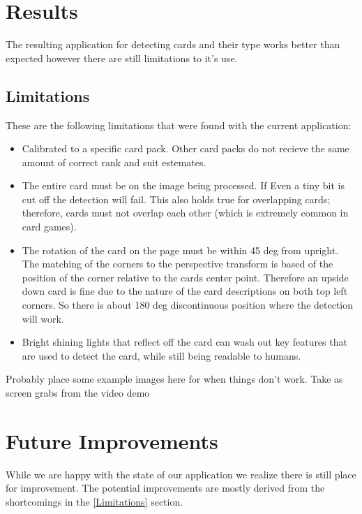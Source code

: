 \documentclass[conference]{IEEEtran}
\begin{document}
\section{Results}
The resulting application for detecting cards and their type works better than expected however
there are still limitations to it's use.

\subsection{Limitations}
These are the following limitations that were found with the current application:
\begin{itemize}
\item Calibrated to a specific card pack. Other card packs do not recieve the same amount of correct
        rank and suit estemates.
\item The entire card must be on the image being processed. If Even a tiny bit is cut off the
        detection will fail. This also holds true for overlapping cards; therefore, cards must not
        overlap each other (which is extremely common in card games).
\item The rotation of the card on the page must be within 45 deg from upright. The matching of the
        corners to the perspective transform is based of the position of the corner relative to the
        cards center point. Therefore an upside down card is fine due to the nature of the card
        descriptions on both top left corners. So there is about 180 deg discontinuous position
        where the detection will work.
\item Bright shining lights that reflect off the card can wash out key features that are used to
        detect the card, while still being readable to humans.
\end{itemize}

Probably place some example images here for when things don't work. Take as screen grabs from the
video demo


\section{Future Improvements}
While we are happy with the state of our application we realize there is still place for
improvement. The potential improvements are mostly derived from the shortcomings in the
\ref{Limitations} section.
\end{document}
